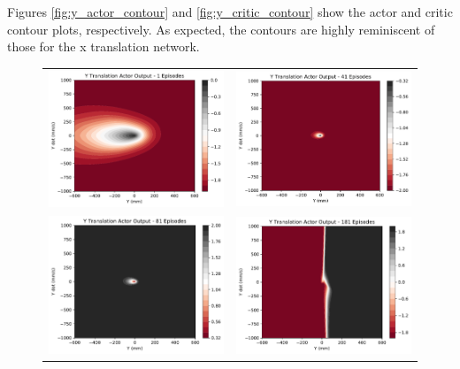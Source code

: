 Figures \ref{fig:y_actor_contour} and \ref{fig:y_critic_contour} show the actor and critic contour plots, respectively. As expected, the contours are highly reminiscent of those for the x translation network.
\begin{figure}[H]
	\begin{tabular}{cc}
		\includegraphics[width=65mm]{figures/train_figs/transy_actor/Actor2_1.pdf} &  
		\includegraphics[width=65mm]{figures/train_figs/transy_actor/Actor2_41.pdf} \\
		\includegraphics[width=65mm]{figures/train_figs/transy_actor/Actor2_81.pdf} &   \includegraphics[width=65mm]{figures/train_figs/transy_actor/Actor2_181.pdf} \\

\end{tabular}
\end{figure}
